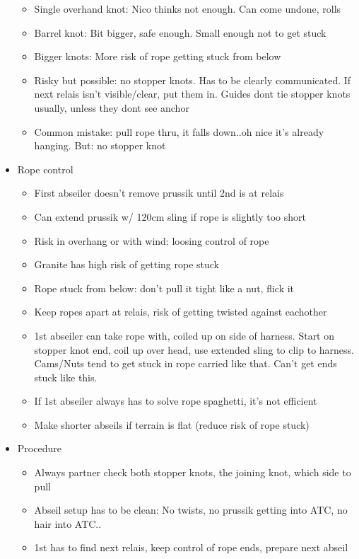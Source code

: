 \begin{itemize}
	\begin{itemize}
	\item Single overhand knot: Nico thinks not enough. Can come undone, rolls
	\item Barrel knot: Bit bigger, safe enough. Small enough not to get stuck
	\item Bigger knots: More risk of rope getting stuck from below
	\item Risky but possible: no stopper knots. Has to be clearly communicated. If next relais isn't visible/clear, put them in. Guides dont tie stopper knots usually, unless they dont see anchor
	\item Common mistake: pull rope thru, it falls down..oh nice it's already hanging. But: no stopper knot
	\end{itemize}
\item Rope control
	\begin{itemize}
	\item First abseiler doesn't remove prussik until 2nd is at relais
	\item Can extend prussik w/ 120cm sling if rope is slightly too short
	\item Risk in overhang or with wind: loosing control of rope
	\item Granite has high risk of getting rope stuck
	\item Rope stuck from below: don't pull it tight like a nut, flick it
	\item Keep ropes apart at relais, risk of getting twisted against eachother
	\item 1st abseiler can take rope with, coiled up on side of harness. Start on stopper knot end, coil up over head, use extended sling to clip to harness. Cams/Nuts tend to get stuck in rope carried like that. Can't get ends stuck like this.
	\item If 1st abseiler always has to solve rope spaghetti, it's not efficient
	\item Make shorter abseils if terrain is flat (reduce risk of rope stuck)
	\end{itemize}
\item Procedure
	\begin{itemize}
	\item Always partner check both stopper knots, the joining knot, which side to pull
	\item Abseil setup has to be clean: No twists, no prussik getting into ATC, no hair into ATC..
	\item 1st has to find next relais, keep control of rope ends, prepare next abseil

\end{itemize}
\end{itemize}
